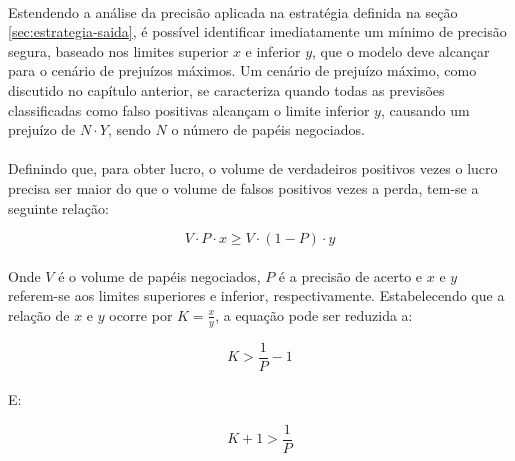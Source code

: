 \documentclass[grad,numbers]{coppe}
\begin{document}
                \paragraph{}Estendendo a análise da precisão aplicada na estratégia definida na seção \ref{sec:estrategia-saida}, é possível identificar imediatamente um mínimo de precisão segura, baseado nos limites superior $x$ e inferior $y$, que o modelo deve alcançar para o cenário de prejuízos máximos. Um cenário de prejuízo máximo, como discutido no capítulo anterior, se caracteriza quando todas as previsões classificadas como falso positivas alcançam o limite inferior $y$, causando um prejuízo de $N \cdot Y$, sendo $N$ o número de papéis negociados. 
                
                \paragraph{}Definindo que, para obter lucro, o volume de verdadeiros positivos vezes o lucro precisa ser maior do que o volume de falsos positivos vezes a perda, tem-se a seguinte relação:
                
                \begin{equation}
                    V \cdot P \cdot x \geq V \cdot (1 - P) \cdot y
                \end{equation}
                
                \paragraph{}Onde $V$ é o volume de papéis negociados, $P$ é a precisão de acerto e $x$ e $y$ referem-se aos limites superiores e inferior, respectivamente. Estabelecendo que a relação de $x$ e $y$ ocorre por $K = \frac{x}{y}$, a equação pode ser reduzida a:
                
                \begin{equation}
                    K > \frac{1}{P} - 1
                \end{equation}
                
                \paragraph{}E:
                
                \begin{equation}
                    K + 1 > \frac{1}{P}                    
                \end{equation}
                
\end{document}
